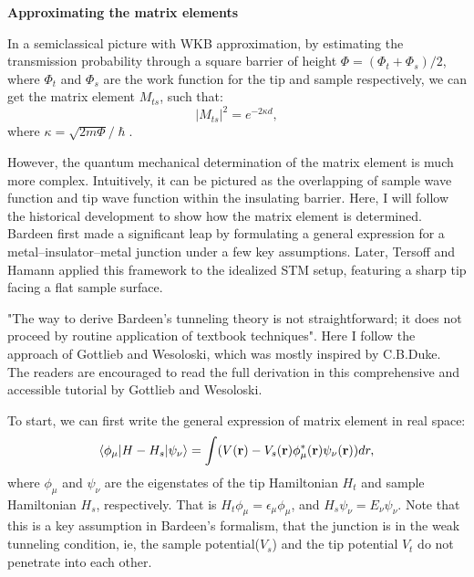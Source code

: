 \vspace{1em}
\noindent\textbf{Approximating the matrix elements}

\noindent In a semiclassical picture with WKB approximation, by estimating the transmission probability through a square barrier of height $\Phi = (\Phi_t + \Phi_s)/2$, where $\Phi_t$ and $\Phi_s$ are the work function for the tip and sample respectively, we can get the matrix element $M_{ts}$, such that: 
\begin{equation}
	|M_{ts}|^2 = e^{-2\kappa d},
\end{equation}
where $\kappa = \sqrt{2m\Phi}/\hslash$.

However, the quantum mechanical determination of the matrix element is much more complex. Intuitively, it can be pictured as the overlapping of sample wave function and tip wave function within the insulating barrier. Here, I will follow the historical development to show how the matrix element is determined. Bardeen first made a significant leap by formulating a general expression for a metal–insulator–metal junction under a few key assumptions. Later, Tersoff and Hamann applied this framework to the idealized STM setup, featuring a sharp tip facing a flat sample surface.

"The way to derive Bardeen's tunneling theory is not straightforward; it does not proceed by routine application of textbook techniques"\cite{gottliebBardeensTunnelingTheory}. Here I follow the approach of Gottlieb and Wesoloski\cite{gottliebBardeensTunnelingTheory}, which was mostly inspired by C.B.Duke\cite{dukeTunnelingSolids1973}. The readers are encouraged to read the full derivation in this comprehensive and accessible tutorial by Gottlieb and Wesoloski\cite{gottliebBardeensTunnelingTheory}. 

To start, we can first write the general expression of matrix element in real space: 
\begin{equation}
	\label{eq:bardeen_1}
	\braket{\phi_{\mu}|H-H_s|\psi_{\nu}} = \int(V(\mathbf{r})- V_s(\mathbf{r})\phi^*_{\mu}(\mathbf{r})\psi_{\nu}(\mathbf{r}))dr,
\end{equation}
where $\phi_{\mu}$ and $\psi_{\nu}$ are the eigenstates of the tip Hamiltonian $H_t$ and sample Hamiltonian $H_s$, respectively. That is $H_t \phi_{\mu} = \epsilon_{\mu} \phi_{\mu}$, and $H_s \psi_{\nu} = E_{\nu} \psi_{\nu}$. Note that this is a key assumption in Bardeen's formalism, that the junction is in the weak tunneling condition, ie, the sample potential($V_s$) and the tip potential $V_t$ do not penetrate into each other. 

